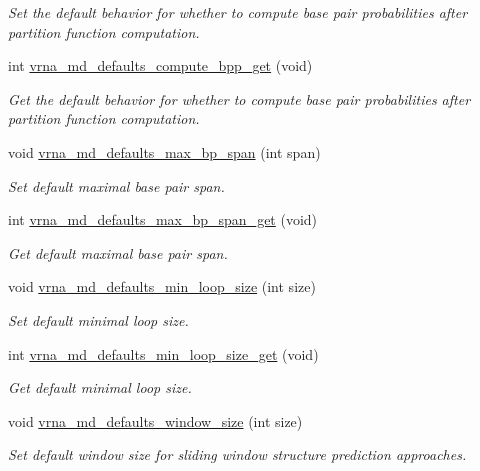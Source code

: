 \begin{DoxyCompactItemize}
\begin{DoxyCompactList}\small\item\em Set the default behavior for whether to compute base pair probabilities after partition function computation. \end{DoxyCompactList}\item 
int \mbox{\hyperlink{group__model__details_gaa3a537e61fbe0518673bf9f73fd820f3}{vrna\+\_\+md\+\_\+defaults\+\_\+compute\+\_\+bpp\+\_\+get}} (void)
\begin{DoxyCompactList}\small\item\em Get the default behavior for whether to compute base pair probabilities after partition function computation. \end{DoxyCompactList}\item 
void \mbox{\hyperlink{group__model__details_ga4c4bc962f09b4480cb8499f1cf8ae4ec}{vrna\+\_\+md\+\_\+defaults\+\_\+max\+\_\+bp\+\_\+span}} (int span)
\begin{DoxyCompactList}\small\item\em Set default maximal base pair span. \end{DoxyCompactList}\item 
int \mbox{\hyperlink{group__model__details_gaa60f989e062fecd4d4bac89c1883da85}{vrna\+\_\+md\+\_\+defaults\+\_\+max\+\_\+bp\+\_\+span\+\_\+get}} (void)
\begin{DoxyCompactList}\small\item\em Get default maximal base pair span. \end{DoxyCompactList}\item 
void \mbox{\hyperlink{group__model__details_gac152f1e78c1058a10261022c8dfda0f7}{vrna\+\_\+md\+\_\+defaults\+\_\+min\+\_\+loop\+\_\+size}} (int size)
\begin{DoxyCompactList}\small\item\em Set default minimal loop size. \end{DoxyCompactList}\item 
int \mbox{\hyperlink{group__model__details_ga5cc691174a75c652807dc361b617632a}{vrna\+\_\+md\+\_\+defaults\+\_\+min\+\_\+loop\+\_\+size\+\_\+get}} (void)
\begin{DoxyCompactList}\small\item\em Get default minimal loop size. \end{DoxyCompactList}\item 
void \mbox{\hyperlink{group__model__details_ga7b802ce0e8c3181bf5cb580de6d5b26a}{vrna\+\_\+md\+\_\+defaults\+\_\+window\+\_\+size}} (int size)
\begin{DoxyCompactList}\small\item\em Set default window size for sliding window structure prediction approaches. \end{DoxyCompactList}\item 

\end{DoxyCompactItemize}
